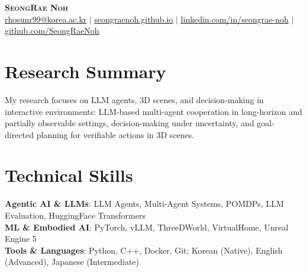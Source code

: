 \documentclass[letterpaper,10pt]{article}
\begin{document}
\begin{center}
    \textbf{\LARGE \scshape SeongRae Noh} \\ \vspace{1pt}
    \small
    \href{mailto:rhosunr99@korea.ac.kr}{\underline{rhosunr99@korea.ac.kr}} $|$
    \href{https://seongraenoh.github.io/}{\underline{seongraenoh.github.io}} $|$
    \href{https://www.linkedin.com/in/seongrae-noh-220b462b7/}{\underline{linkedin.com/in/seongrae-noh}} $|$
    \href{https://github.com/SeongRaeNoh}{\underline{github.com/SeongRaeNoh}}
\end{center}


\section{Research Summary}
 \begin{itemize}[leftmargin=0.15in, label={}]
    \small{\item{
     My research focuses on LLM agents, 3D scenes, and decision-making in interactive environments: LLM-based multi-agent cooperation in long-horizon and partially observable settings, decision-making under uncertainty, and goal-directed planning for verifiable actions in 3D scenes.
    }}
 \end{itemize}


\section{Technical Skills}
 \begin{itemize}[leftmargin=0.15in, label={}]
    \small{\item{
     \textbf{Agentic AI \& LLMs}{: LLM Agents, Multi-Agent Systems, POMDPs, LLM Evaluation, HuggingFace Transformers} \\
     \textbf{ML \& Embodied AI}{: PyTorch, vLLM, ThreeDWorld, VirtualHome, Unreal Engine 5} \\
     \textbf{Tools \& Languages}{: Python, C++, Docker, Git; Korean (Native), English (Advanced), Japanese (Intermediate)}
    }}
 \end{itemize}


\end{document}
